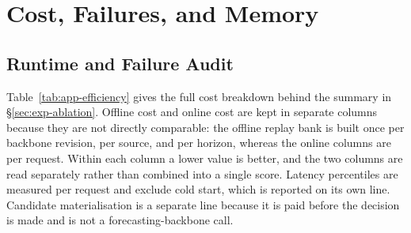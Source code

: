 \documentclass{article}
\begin{document}
\begin{table}[h]
  \caption{Mask-realisation stability. Each row is one deterministic mask realisation on the
  pre-registered subset. The spread across realisations is a stability diagnostic and is not
  an additional sample of parents.}
  \label{tab:app-seeds}
  \centering
  \small
  \setlength{\tabcolsep}{4pt}
\end{table}

\section{Cost, Failures, and Memory}
\label{app:cost-full}
\subsection{Runtime and Failure Audit}
\label{app:calls}
Table~\ref{tab:app-efficiency} gives the full cost breakdown behind the summary in
\S\ref{sec:exp-ablation}. Offline cost and online cost are kept in separate columns because
they are not directly comparable: the offline replay bank is built once per backbone revision,
per source, and per horizon, whereas the online columns are per request. Within each column a
lower value is better, and the two columns are read separately rather than combined into a
single score. Latency percentiles are measured per request and exclude cold start, which is
reported on its own line. Candidate materialisation is a separate line because it is paid
before the decision is made and is not a forecasting-backbone call.
\end{document}
